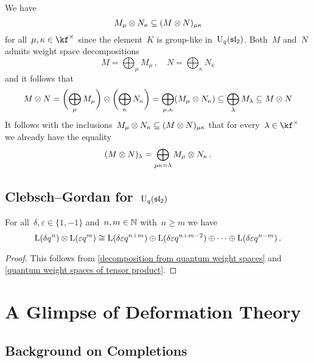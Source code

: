 \documentclass[a4paper, 11pt, oneside]{scrartcl}
\begin{document}
We have
\[
  M_\mu \otimes N_\kappa
  \subseteq
  (M \otimes N)_{\mu \kappa}
\]
for all~$\mu, \kappa \in \kf^\times$ since the element~$K$ is group-like in~$\operatorname{U}_q(\mathfrak{sl}_2)$.
Both~$M$ and~$N$ admits weight space decompositions
\[
  M = \bigoplus_\mu M_\mu \,,
  \quad
  N = \bigoplus_\kappa N_\kappa
\]
and it follows that
\[
  M \otimes N
  =
  \biggl( \bigoplus_\mu M_\mu  \biggr)
  \otimes
  \biggl( \bigoplus_\kappa N_\kappa  \biggr)
  =
  \bigoplus_{\mu, \kappa} (M_\mu \otimes N_\kappa)
  \subseteq
  \bigoplus_{\lambda} M_{\lambda}
  \subseteq
  M \otimes N
\]
It follows with the inclusions~$M_\mu \otimes N_\kappa \subseteq (M \otimes N)_{\mu \kappa}$ that for every~$\lambda \in \kf^\times$ we already have the equality
\[
  (M \otimes N)_{\lambda}
  =
  \bigoplus_{\mu \kappa = \lambda}
  M_\mu \otimes N_\kappa \,.
\]



\subsection{Clebsch–Gordan for~\texorpdfstring{$\operatorname{U}_q(\mathfrak{sl}_2)$}{Uq(sl2)}}
\label{quantum clebsch gordan}

\begin{proposition}
  For all~$\delta, \varepsilon \in \{1, -1\}$ and~$n, m \in \mathbb{N}$ with~$n \geq m$ we have
  \[
    \operatorname{L}(\delta q^n) \otimes \operatorname{L}(\varepsilon q^m)
    \cong
    \operatorname{L}(\delta \varepsilon q^{n+m})
    \oplus
    \operatorname{L}(\delta \varepsilon q^{n+m-2})
    \oplus
    \dotsb
    \oplus
    \operatorname{L}(\delta \varepsilon q^{n-m}) \,.
  \]
\end{proposition}

\begin{proof}
  This follows from \cref{decomposition from quantum weight spaces} and \cref{quantum weight spaces of tensor product}.
\end{proof}





\section{A Glimpse of Deformation Theory}
\label{deformation theory}



\subsection{Background on Completions}
\end{document}

